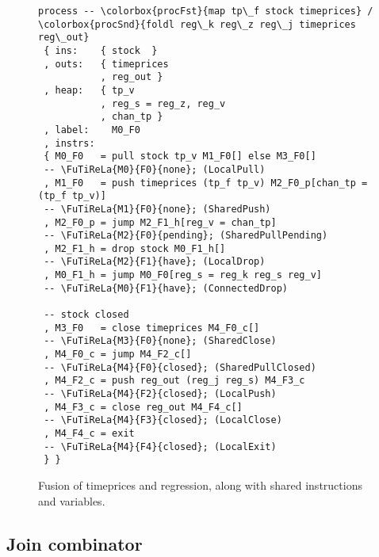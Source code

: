 \begin{figure}
\begin{lstlisting}[language=process,linebackgroundcolor={
  \hilineFst{2}
  \hilineFst{3}
  \hilineSnd{4}
  \hilineFst{5}
  \hilineSnd{6}
  \hilineCom{7}
  \hilineFst{10}
  \hilineFst{11}
  \hilineFst{12}
  \hilineFst{13}
  \hilineSnd{14}
  \hilineSnd{15}
  \hilineFst{16}
  \hilineFst{17}
  \hilineSnd{18}
  \hilineSnd{19}
  \hilineFst{22}
  \hilineFst{23}
  \hilineSnd{24}
  \hilineSnd{25}
  \hilineSnd{26}
  \hilineSnd{27}
  \hilineSnd{28}
  \hilineSnd{29}
  \hilineCom{30}
  \hilineCom{31}
  }]
process -- \colorbox{procFst}{map tp\_f stock timeprices} / \colorbox{procSnd}{foldl reg\_k reg\_z reg\_j timeprices reg\_out}
 { ins:    { stock  }
 , outs:   { timeprices
           , reg_out }
 , heap:   { tp_v
           , reg_s = reg_z, reg_v
           , chan_tp }
 , label:    M0_F0
 , instrs:
 { M0_F0   = pull stock tp_v M1_F0[] else M3_F0[]
 -- \FuTiReLa{M0}{F0}{none}; (LocalPull)
 , M1_F0   = push timeprices (tp_f tp_v) M2_F0_p[chan_tp = (tp_f tp_v)]
 -- \FuTiReLa{M1}{F0}{none}; (SharedPush)
 , M2_F0_p = jump M2_F1_h[reg_v = chan_tp]
 -- \FuTiReLa{M2}{F0}{pending}; (SharedPullPending)
 , M2_F1_h = drop stock M0_F1_h[] 
 -- \FuTiReLa{M2}{F1}{have}; (LocalDrop)
 , M0_F1_h = jump M0_F0[reg_s = reg_k reg_s reg_v]
 -- \FuTiReLa{M0}{F1}{have}; (ConnectedDrop)

 -- stock closed
 , M3_F0   = close timeprices M4_F0_c[] 
 -- \FuTiReLa{M3}{F0}{none}; (SharedClose)
 , M4_F0_c = jump M4_F2_c[] 
 -- \FuTiReLa{M4}{F0}{closed}; (SharedPullClosed)
 , M4_F2_c = push reg_out (reg_j reg_s) M4_F3_c 
 -- \FuTiReLa{M4}{F2}{closed}; (LocalPush)
 , M4_F3_c = close reg_out M4_F4_c[] 
 -- \FuTiReLa{M4}{F3}{closed}; (LocalClose)
 , M4_F4_c = exit
 -- \FuTiReLa{M4}{F4}{closed}; (LocalExit)
 } }
\end{lstlisting}
\caption{Fusion of \colorbox{procFst}{timeprices} and \colorbox{procSnd}{regression}, along with \colorbox{procCommon}{shared} instructions and variables. }
\label{figs/procs/instance/fused-timeprices-regression}
\end{figure}

\subsection{Join combinator}

